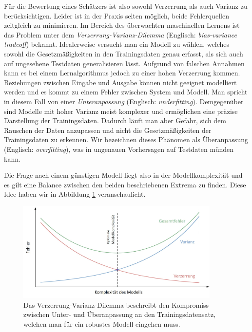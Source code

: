 Für die Bewertung eines Schätzers ist also sowohl Verzerrung als auch Varianz zu berücksichtigen. Leider ist in der Praxis selten möglich, beide Fehlerquellen zeitgleich zu minimieren. Im Bereich des überwachten maschinellen Lernens ist das Problem unter dem \textit{Verzerrung-Varianz-Dilemma} (Englisch: \textit{bias-variance tradeoff}) bekannt. Idealerweise versucht man ein Modell zu wählen, welches sowohl die Gesetzmäßigkeiten in den Trainingsdaten genau erfasst, als sich auch auf ungesehene Testdaten generalisieren lässt.
Aufgrund von falschen Annahmen kann es bei einem Lernalgorithmus jedoch zu einer hohen Verzerrung kommen. Beziehungen zwischen Eingabe und Ausgabe können nicht geeignet modelliert werden und es kommt zu einem Fehler zwischen System und Modell. Man spricht in diesem Fall von einer \textit{Unteranpassung} (Englisch: \textit{underfitting}).
Demgegenüber sind Modelle mit hoher Varianz meist komplexer und ermöglichen eine präzise Darstellung der Trainingsdaten. Dadurch läuft man aber Gefahr, sich dem Rauschen der Daten anzupassen und nicht die Gesetzmäßigkeiten der Trainingsdaten zu erkennen. Wir bezeichnen dieses Phänomen als Überanpassung (Englisch: \textit{overfitting}), was in ungenauen Vorhersagen auf Testdaten münden kann. 

Die Frage nach einem günstigen Modell liegt also in der Modellkomplexität und es gilt eine Balance zwischen den beiden beschriebenen Extrema zu finden. Diese Idee haben wir in Abbildung \ref{bias_variance_tradeoff} veranschaulicht.

\begin{figure}
\centering
\includegraphics[width = 0.9\textwidth]{figures/bias_variance_tradeoff_labeled.jpg}
\caption{Das Verzerrung-Varianz-Dilemma beschreibt den Kompromiss zwischen Unter- und Überanpassung an den Trainingsdatensatz, welchen man für ein robustes Modell eingehen muss.}
\label{bias_variance_tradeoff}
\end{figure}


